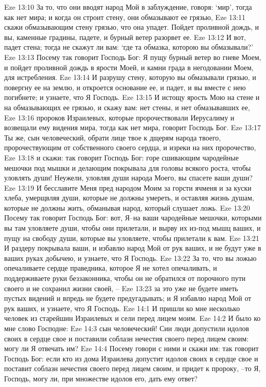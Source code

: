 Eze 13:10  За то, что они вводят народ Мой в заблуждение, говоря: `мир', тогда как нет мира; и когда он строит стену, они обмазывают ее грязью,
Eze 13:11  скажи обмазывающим стену грязью, что она упадет. Пойдет проливной дождь, и вы, каменные градины, падете, и бурный ветер разорвет ее.
Eze 13:12  И вот, падет стена; тогда не скажут ли вам: `где та обмазка, которою вы обмазывали?'
Eze 13:13  Посему так говорит Господь Бог: Я пущу бурный ветер во гневе Моем, и пойдет проливной дождь в ярости Моей, и камни града в негодовании Моем, для истребления.
Eze 13:14  И разрушу стену, которую вы обмазывали грязью, и повергну ее на землю, и откроется основание ее, и падет, и вы вместе с нею погибнете; и узнаете, что Я Господь.
Eze 13:15  И истощу ярость Мою на стене и на обмазывающих ее грязью, и скажу вам: нет стены, и нет обмазывавших ее,
Eze 13:16  пророков Израилевых, которые пророчествовали Иерусалиму и возвещали ему видения мира, тогда как нет мира, говорит Господь Бог.
Eze 13:17  Ты же, сын человеческий, обрати лице твое к дщерям народа твоего, пророчествующим от собственного своего сердца, и изреки на них пророчество,
Eze 13:18  и скажи: так говорит Господь Бог: горе сшивающим чародейные мешочки под мышки и делающим покрывала для головы всякого роста, чтобы уловлять души! Неужели, уловляя души народа Моего, вы спасете ваши души?
Eze 13:19  И бесславите Меня пред народом Моим за горсти ячменя и за куски хлеба, умерщвляя души, которые не должны умереть, и оставляя жизнь душам, которые не должны жить, обманывая народ, который слушает ложь.
Eze 13:20  Посему так говорит Господь Бог: вот, Я--на ваши чародейные мешочки, которыми вы там уловляете души, чтобы они прилетали, и вырву их из-под мышц ваших, и пущу на свободу души, которые вы уловляете, чтобы прилетали к вам.
Eze 13:21  И раздеру покрывала ваши, и избавлю народ Мой от рук ваших, и не будут уже в ваших руках добычею, и узнаете, что Я Господь.
Eze 13:22  За то, что вы ложью опечаливаете сердце праведника, которое Я не хотел опечаливать, и поддерживаете руки беззаконника, чтобы он не обратился от порочного пути своего и не сохранил жизни своей, --
Eze 13:23  за это уже не будете иметь пустых видений и впредь не будете предугадывать; и Я избавлю народ Мой от рук ваших, и узнаете, что Я Господь.
Eze 14:1  И пришли ко мне несколько человек из старейшин Израилевых и сели перед лицем моим.
Eze 14:2  И было ко мне слово Господне:
Eze 14:3  сын человеческий! Сии люди допустили идолов своих в сердце свое и поставили соблазн нечестия своего перед лицем своим: могу ли Я отвечать им?
Eze 14:4  Посему говори с ними и скажи им: так говорит Господь Бог: если кто из дома Израилева допустит идолов своих в сердце свое и поставит соблазн нечестия своего перед лицем своим, и придет к пророку, --то Я, Господь, могу ли, при множестве идолов его, дать ему ответ?
